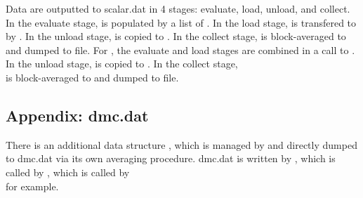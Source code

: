 Data are outputted to scalar.dat in 4 stages: evaluate, load, unload, and collect. In the evaluate stage,  is populated by a list of . In the load stage,  is transfered to  by . In the unload stage,  is copied to . In the collect stage,  is block-averaged to \\  and dumped to file. For , the evaluate and load stages are combined in a call to . In the unload stage,  is copied to . In the collect stage, \\  is block-averaged to  and dumped to file.

\subsection{Appendix: dmc.dat}

There is an additional data structure , which is managed by  and directly dumped to dmc.dat via its own averaging procedure. dmc.dat is written by , which is called by , which is called by \\  for example.
